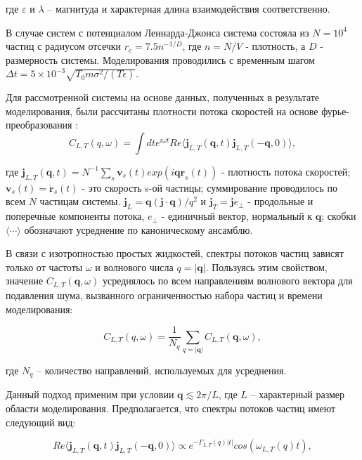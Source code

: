 где $\varepsilon$ и $\lambda$ – магнитуда и характерная длина взаимодействия соответственно.

В случае систем с потенциалом Леннарда-Джонса система состояла из $N = 10^4$ частиц с радиусом отсечки $r_c = 7.5 n^{-1/D}$, где $n = N/V$ - плотность, а $D$ - размерность системы. Моделирования проводились с временным шагом $\Delta t = 5 \times 10^{-3} \sqrt{T_0 m \sigma^2/(T\epsilon)}$.



Для рассмотренной системы на основе данных, полученных в результате моделирования, были рассчитаны плотности потока скоростей на основе фурье-преобразования \cite{Khrapak:2018aa}:\\
\begin{equation}
C_{L, T}(q, \omega) = \int dt e^{i\omega t} Re \langle \mathbf{j}_{L,T} (\mathbf{q}, t) \mathbf{j}_{L,T} (-\mathbf{q}, 0)\rangle,
\label{VelCurrent}
\end{equation}

\noindent
где $\mathbf{j}_{L,T} (\mathbf{q}, t) = N^{-1}\sum_s \mathbf{v}_s(t)exp(i \mathbf{qr}_s(t))$ - плотность потока скоростей; $\mathbf{v}_s(t) = \dot{\mathbf{r}}_s(t)$ - это скорость s-ой частицы; суммирование проводилось по всем $N$ частицам системы. $\mathbf{j}_L = \mathbf{q}(\mathbf{j\cdot q})/q^2$ и $\mathbf{j}_T = \mathbf{j} e_{\bot}$ - продольные
и поперечные компоненты потока, $e_{\bot}$ - единичный вектор, нормальный к $\mathbf{q}$; скобки $\langle \cdots \rangle$ обозначают усреднение по каноническому ансамблю.


В связи с изотропностью простых жидкостей, спектры потоков частиц зависят только от частоты $\omega $ и волнового числа $q = |\mathbf{q}|$. Пользуясь этим свойством, значение $C_{L, T}(\mathbf{q}, \omega)$ 
усреднялось по всем направлениям волнового вектора для подавления шума, вызванного ограниченностью набора частиц и времени моделирования:


\begin{equation}
C_{L, T}(q, \omega) = \frac{1}{N_q}\sum_{q = |\mathbf{q}|} C_{L, T}(\mathbf{q}, \omega),
\label{VelCurrentMean}
\end{equation}

\noindent
где $N_q$ -- количество направлений, используемых для усреднения.

Данный подход применим при условии $\mathbf{q} \lesssim 2\pi /L$, где
$L$ -- характерный размер области моделирования. Предполагается, что спектры потоков частиц имеют следующий вид:

\begin{equation}
Re \langle \mathbf{j}_{L,T} (\mathbf{q}, t) \mathbf{j}_{L,T} (-\mathbf{q}, 0)\rangle \propto e^{-\Gamma _{L, T}(q)|t| }cos(\omega_{L,T}(q)t),
\label{Doe}
\end{equation}

